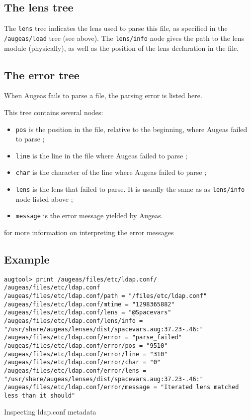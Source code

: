 \subsection{The lens tree}

The \verb!lens! tree indicates the lens used to parse this file, as specified in the \nolinkurl{/augeas/load} tree (see above). The \verb!lens/info! node gives the path to the lens module (physically), as well as the position of the lens declaration in the file.

\subsection{The error tree}

When Augeas fails to parse a file, the parsing error is listed here.

This tree contains several nodes:

\begin{itemize}
\item
  \verb!pos! is the position in the file, relative to the beginning, where Augeas failed to parse ;
\item
  \verb!line! is the line in the file where Augeas failed to parse ;
\item
  \verb!char! is the character of the line where Augeas failed to parse ;
\item
  \verb!lens! is the lens that failed to parse. It is usually the same as as \verb!lens/info! node listed above ;
\item
  \verb!message! is the error message yielded by Augeas.
\end{itemize}

 for more information on interpreting the error messages


\subsection{Example}

\begin{listing}
  \begin{verbatim}
augtool> print /augeas/files/etc/ldap.conf/
/augeas/files/etc/ldap.conf
/augeas/files/etc/ldap.conf/path = "/files/etc/ldap.conf"
/augeas/files/etc/ldap.conf/mtime = "1298365882"
/augeas/files/etc/ldap.conf/lens = "@Spacevars"
/augeas/files/etc/ldap.conf/lens/info = "/usr/share/augeas/lenses/dist/spacevars.aug:37.23-.46:"
/augeas/files/etc/ldap.conf/error = "parse_failed"
/augeas/files/etc/ldap.conf/error/pos = "9510"
/augeas/files/etc/ldap.conf/error/line = "310"
/augeas/files/etc/ldap.conf/error/char = "0"
/augeas/files/etc/ldap.conf/error/lens = "/usr/share/augeas/lenses/dist/spacevars.aug:37.23-.46:"
/augeas/files/etc/ldap.conf/error/message = "Iterated lens matched less than it should"
  \end{verbatim}
  \caption{Inspecting ldap.conf metadata}
  \label{lst:metadata_ldap_conf}
\end{listing}


